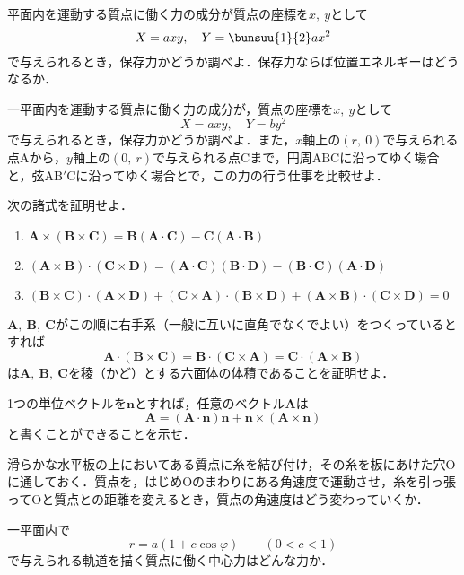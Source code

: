 \begin{enumerate}[label=\textbf{[\arabic*]}, labelsep=10pt, leftmargin=23pt]
	\item 平面内を運動する質点に働く力の成分が質点の座標を$x,\ y$として
		\begin{equation*}
			X = axy,\quad Y = \bunsuu{1}{2}ax^2
		\end{equation*}
		で与えられるとき，保存力かどうか調べよ．保存力ならば位置エネルギーはどうなるか．
	\item 一平面内を運動する質点に働く力の成分が，質点の座標を$x,\ y$として
		\begin{equation*}
			X = axy,\quad Y = by^2
		\end{equation*}
		で与えられるとき，保存力かどうか調べよ．また，$x$軸上の$(r,\ 0)$で与えられる点$\mathrm{A}$から，$y$軸上の$(0,\ r)$で与えられる点$\mathrm{C}$まで，円周$\mathrm{ABC}$に沿ってゆく場合と，弦$\mathrm{AB'C}$に沿ってゆく場合とで，この力の行う仕事を比較せよ．
	\item 次の諸式を証明せよ．
		\begin{enumerate}[label={(\alph*)}, labelsep=10pt]
			\item $\bm{A} \times (\bm{B} \times \bm{C}) = \bm{B}(\bm{A} \cdot \bm{C}) - \bm{C}(\bm{A} \cdot \bm{B})$
			\item $(\bm{A} \times \bm{B}) \cdot (\bm{C} \times \bm{D}) = (\bm{A} \cdot \bm{C})(\bm{B} \cdot \bm{D}) - (\bm{B} \cdot \bm{C})(\bm{A} \cdot \bm{D})$
			\item $(\bm{B} \times \bm{C})\cdot(\bm{A} \times \bm{D}) + (\bm{C} \times \bm{A}) \cdot (\bm{B} \times \bm{D}) + (\bm{A} \times \bm{B}) \cdot (\bm{C} \times \bm{D}) = 0$
		\end{enumerate}
	\item $\bm{A},\ \bm{B},\ \bm{C}$がこの順に右手系（一般に互いに直角でなくでよい）をつくっているとすれば
		\begin{equation*}
			\bm{A} \cdot (\bm{B} \times \bm{C}) = \bm{B} \cdot (\bm{C} \times \bm{A}) = \bm{C} \cdot (\bm{A} \times \bm{B})
		\end{equation*}
		は$\bm{A},\ \bm{B},\ \bm{C}$を稜（かど）とする六面体の体積であることを証明せよ．
	\item 1つの単位ベクトルを$\bm{n}$とすれば，任意のベクトル$\bm{A}$は
		\begin{equation*}
			\bm{A} = (\bm{A} \cdot \bm{n})\bm{n} + \bm{n} \times (\bm{A} \times \bm{n})
		\end{equation*}
		と書くことができることを示せ．
	\item 滑らかな水平板の上においてある質点に糸を結び付け，その糸を板にあけた穴$\mathrm{O}$に通しておく．質点を，はじめOのまわりにある角速度で運動させ，糸を引っ張ってOと質点との距離を変えるとき，質点の角速度はどう変わっていくか．
	\item 一平面内で
		\begin{equation*}
			r = a(1 + c\cos \varphi)\qquad (0 < c < 1)
		\end{equation*}
		で与えられる軌道を描く質点に働く中心力はどんな力か．
\end{enumerate}
